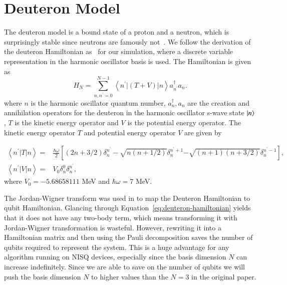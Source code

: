 \section{Deuteron Model}
\label{sec:deutron_model}

The deuteron model is a bound state of a proton and a neutron, which is surprisingly stable since neutrons are famously not~\cite{mit_deuteron}. We follow the derivation of the deuteron Hamiltonian as~\cite{Dumitrescu2018, Binder2016, Bansal2017} for our simulation, where a discrete variable representation in the harmonic oscillator basis is used. The Hamiltonian is given as
\begin{equation}
    \label{eq:deuteron-hamiltonian}
	H_N=\sum_{n, n^{\prime}=0}^{N-1}\left\langle n^{\prime}|(T+V)| n\right\rangle a_{n^{\prime}}^{\dagger} a_n.
\end{equation}
where $ n $ is the harmonic oscillator quantum number, $ a_n^\dagger, a_n $ are the creation and annihilation operators for the deuteron in the harmonic oscillator s-wave state $\ket{n} $, $ T $ is the kinetic energy operator and $ V $ is the potential energy operator. The kinetic energy operator $ T $ and potential energy operator $ V $ are given by 

\begin{equation}
	\begin{aligned}
	\left\langle n^{\prime}|T| n\right\rangle= & \frac{\hbar \omega}{2}\left[(2 n+3 / 2) \delta_n^{n^{\prime}}-\sqrt{n(n+1 / 2)} \delta_n^{n^{\prime}+1}\right. \left.-\sqrt{(n+1)(n+3 / 2)} \delta_n^{n^{\prime}-1}\right], \\
	\left\langle n^{\prime}|V| n\right\rangle= & V_0 \delta_n^0 \delta_n^{n^{\prime}},
	\end{aligned}
\end{equation}
where $V_0 = -5.68658111 $ MeV and $ \hbar \omega = 7 $ MeV.

The Jordan-Wigner transform was used in \cite{Dumitrescu2018} to map the Deuteron Hamiltonian to qubit Hamiltonian. Glancing through Equation~\eqref{eq:deuteron-hamiltonian} yields that it does not have any two-body term, which means transforming it with Jordan-Wigner transformation is wasteful. However, rewriting it into a Hamiltonian matrix and then using the Pauli decomposition saves the number of qubits required to represent the system. This is a huge advantage for any algorithm running on NISQ devices, especially since the basis dimension $ N $ can increase indefinitely. Since we are able to save on the number of qubits we will push the basis dimension $ N $ to higher values than the $ N=3 $ in the original paper.


